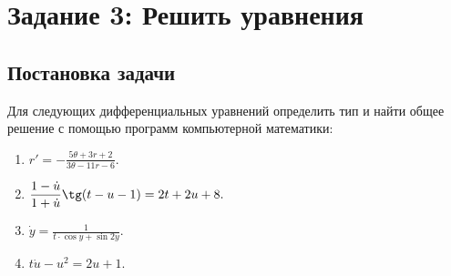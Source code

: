 \documentclass[14pt, a4paper, titlepage, fleqn]{extarticle}
\begin{document}
    \pagebreak

    \section{Задание 3: Решить уравнения}
        \subsection{Постановка задачи}
            Для следующих дифференциальных уравнений определить тип и найти
            общее решение с помощью программ компьютерной математики:
            \begin{enumerate}
                \item 
                \(
                    \displaystyle
                    r' = -\frac{5\theta + 3r + 2}{3\theta -11r-6}.
                \)

                \item 
                \(
                    \displaystyle
                    \frac{1-\dot{u}}{1+\dot{u}} \tg (t-u-1) = 2t+2u+8.
                \)

                \item 
                \(
                    \displaystyle
                    \dot{y} = \frac{1}{t \cdot \cos{y} + \sin{2y}}.
                \)
                
                \item 
                \(
                    t\dot{u} - u^2=2u+1.
                \)
            \end{enumerate}
\end{document}
